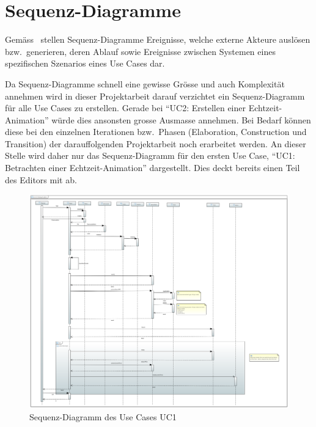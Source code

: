 
\section{Sequenz-Diagramme}
\label{sec:sequence-diagrams}

Gemäss~\cite{larman_applying_2004} stellen Sequenz-Diagramme Ereignisse, welche
externe Akteure auslösen bzw.\ generieren, deren Ablauf sowie Ereignisse
zwischen Systemen eines spezifischen Szenarios eines Use Cases dar.

Da Sequenz-Diagramme schnell eine gewisse Grösse und auch Komplexität annehmen
wird in dieser Projektarbeit darauf verzichtet ein Sequenz-Diagramm für alle
Use Cases zu erstellen. Gerade bei ``UC2: Erstellen einer Echtzeit-Animation''
würde dies ansonsten grosse Ausmasse annehmen. Bei Bedarf können diese bei den
einzelnen Iterationen bzw.\ Phasen (Elaboration, Construction und Transition)
der darauffolgenden Projektarbeit noch erarbeitet werden. An dieser Stelle wird
daher nur das Sequenz-Diagramm für den ersten Use Case, ``UC1: Betrachten einer
Echtzeit-Animation'' dargestellt. Dies deckt bereits einen Teil des Editors mit
ab.

\begin{figure}[H]
    \centering
    \includegraphics[angle=90,width=1.0\textwidth]{img/sequence_diagram_uc1.png}
    \caption{Sequenz-Diagramm  des Use Cases UC1
        \protect\footnotemark}\label{fig:sequence-diagrams:uc1}
\end{figure}

